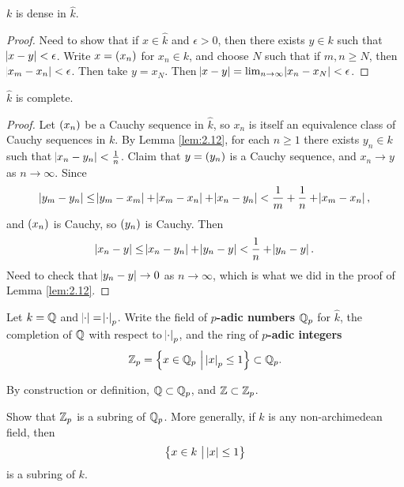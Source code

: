 \pagebreak

\begin{lemma}
\label{lem:2.12}
$ k $ is dense in $ \widehat{k} $.
\end{lemma}

\begin{proof}
Need to show that if $ x \in \widehat{k} $ and $ \epsilon > 0 $, then there exists $ y \in k $ such that $ \abs{x - y} < \epsilon $. Write $ x = \br{x_n} $ for $ x_n \in k $, and choose $ N $ such that if $ m, n \ge N $, then $ \abs{x_m - x_n} < \epsilon $. Then take $ y = x_N $. Then $ \abs{x - y} = \lim_{n \to \infty} \abs{x_n - x_N} < \epsilon $.
\end{proof}

\begin{lemma}
$ \widehat{k} $ is complete.
\end{lemma}

\begin{proof}
Let $ \br{x_n} $ be a Cauchy sequence in $ \widehat{k} $, so $ x_n $ is itself an equivalence class of Cauchy sequences in $ k $. By Lemma \ref{lem:2.12}, for each $ n \ge 1 $ there exists $ y_n \in k $ such that $ \abs{x_n - y_n} < \tfrac{1}{n} $. Claim that $ y = \br{y_n} $ is a Cauchy sequence, and $ x_n \to y $ as $ n \to \infty $. Since
$$ \abs{y_m - y_n} \le \abs{y_m - x_m} + \abs{x_m - x_n} + \abs{x_n - y_n} < \dfrac{1}{m} + \dfrac{1}{n} + \abs{x_m - x_n}, $$
and $ \br{x_n} $ is Cauchy, so $ \br{y_n} $ is Cauchy. Then
$$ \abs{x_n - y} \le \abs{x_n - y_n} + \abs{y_n - y} < \dfrac{1}{n} + \abs{y_n - y}. $$
Need to check that $ \abs{y_n - y} \to 0 $ as $ n \to \infty $, which is what we did in the proof of Lemma \ref{lem:2.12}.
\end{proof}

\begin{definition}
Let $ k = \mathbb{Q} $ and $ \abs{\cdot} = \abs{\cdot}_p $. Write the field of \textbf{$ p $-adic numbers} $ \mathbb{Q}_p $ for $ \widehat{k} $, the completion of $ \mathbb{Q} $ with respect to $ \abs{\cdot}_p $, and the ring of \textbf{$ p $-adic integers}
$$ \ZZ_p = \cbr{x \in \QQ_p \st \abs{x}_p \le 1} \subset \QQ_p. $$
\end{definition}

By construction or definition, $ \mathbb{Q} \subset \mathbb{Q}_p $, and $ \mathbb{Z} \subset \mathbb{Z}_p $.

\begin{exercise}
Show that $ \mathbb{Z}_p $ is a subring of $ \mathbb{Q}_p $. More generally, if $ k $ is any non-archimedean field, then
$$ \cbr{x \in k \st \abs{x} \le 1} $$
is a subring of $ k $.
\end{exercise}

